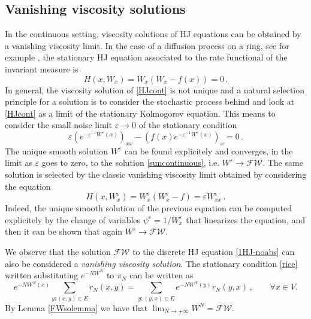 \documentclass[reqno]{amsart}
\theoremstyle{plain}
\theoremstyle{definition}
\theoremstyle{remark}
\numberwithin{equation}{section}
\numberwithin{theorem}{section}
\renewcommand{\epsilon}{\varepsilon}
\newcommand{\<}{\langle}
\renewcommand{\>}{\rangle}
\begin{document}
\subsection{Vanishing viscosity solutions}

In the continuous setting, viscosity solutions of HJ equations can be obtained by a vanishing viscosity limit. In the case of a diffusion process on a ring, see for example \cite{FW,FG},  the stationary HJ equation associated to the rate functional of the invariant measure is 
\begin{equation}\label{HJcont}
	H(x,W_x)=W_x(W_x-f(x))=0\,.
\end{equation}
In general, the viscosity solution of \eqref{HJcont} is not unique and a natural selection principle for a solution is to consider the stochastic process behind and look at \eqref{HJcont} as a limit of the stationary Kolmogorov equation. This means to consider the small noise limit $\epsilon \to 0$ of the stationary condition
\begin{equation}
	\epsilon \left(e^{-\epsilon^{-1}W^\epsilon(x)}\right)_{xx}-\left(f(x)e^{-\epsilon^{-1}W^\epsilon(x)}\right)_x=0\,.
\end{equation}
The unique smooth solution $W^\epsilon$ can be found explicitely and converges, in the limit as $\epsilon$ goes to zero, to the solution \eqref{suncontinuous}, i.e. $W^\epsilon\to \mathscr{FW}$. The same solution is selected by the classic vanishing viscosity limit obtained by considering the equation
\begin{equation}
	H(x, W^\epsilon_x)=W^\epsilon_x\left(W^\epsilon_x-f\right)=\epsilon W^\epsilon_{xx}\,.
\end{equation}
Indeed, the unique smooth solution of the previous equation can be computed explicitely by the change of variables $\psi^\epsilon=1/W_x^\epsilon$ that linearizes the equation, and then it can be shown that again $W^\epsilon \to \mathscr{FW}$.

\smallskip


We observe that the solution $\mathscr{FW}$ to the discrete HJ equation \eqref{1HJ-noabs} can also be considered  a \textit{vanishing viscosity solution}. The stationary condition \eqref{rice} written substituting $e^{-NW^N}$ to $\pi_N$ can be written as
\begin{equation}\label{rice2}
	e^{-NW^N(x)}\sum_{y: (x,y)\in E} r_N(x,y)=\sum_{y:(y,x)\in E} e^{-NW^N(y)}r_N(y,x)\,, \qquad \forall x\in V.
\end{equation}
By Lemma \ref{FWsolemma} we have that $\lim_{N\to +\infty} W^N=\mathscr{FW}$.
\end{document}
